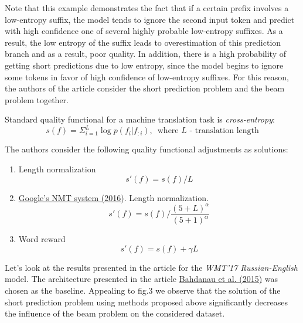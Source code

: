 \documentclass[a4paper,14pt]{extarticle}
\newcommand{\bibref}[3]{\hyperlink{#1}{#2 (#3)}}
\begin{document}
	Note that this example demonstrates the fact that if a certain prefix involves a low-entropy suffix, the model tends to ignore the second input token and predict with high confidence one of several highly probable low-entropy suffixes. As a result, the low entropy of the suffix leads to overestimation of this prediction branch and as a result, poor quality. In addition, there is a high probability of getting short predictions due to low entropy, since the model begins to ignore some tokens in favor of high confidence of low-entropy suffixes. For this reason, the authors of the article consider the short prediction problem and the beam problem together.
	
	Standard quality functional for a machine translation task is \textit{cross-entropy}:
	\begin{equation}
		s(f) = \Sigma_{i=1}^{L}\log p(f_i | f_{:i}), \,\,\, \text{where $L$ - translation length}
	\end{equation}
	
	The authors consider the following quality functional adjustments as solutions:
	\begin{enumerate}
		\item Length normalization
		\begin{equation}
			s'(f) = s(f) / L
		\end{equation}
		
		\item \bibref{gnmt}{Google's NMT system}{2016}. Length normalization. 
		\begin{equation}
			s'(f) = s(f) \Big/ \frac{(5 + L) ^ \alpha}{(5 + 1) ^ \alpha}
		\end{equation}
		
		\item Word reward
		\begin{equation}
			s'(f) = s(f) + \gamma L
		\end{equation}
	\end{enumerate}
	
	Let's look at the results presented in the article for the \textit{WMT'17 Russian-English} model. The architecture presented in the article \bibref{encdec_att}{Bahdanau et al.}{2015} was chosen as the baseline. Appealing to fig.3 we observe that the solution of the short prediction problem using methods proposed above significantly decreases the influence of the beam problem on the considered dataset.
	
	\begin{figure}[t]
	\end{figure}
	
\end{document}
